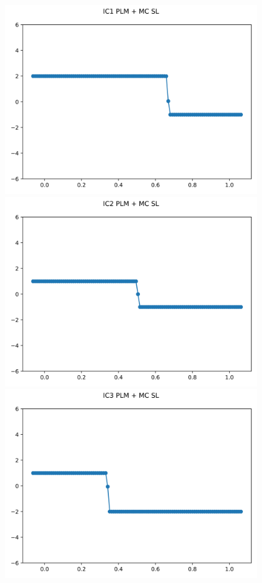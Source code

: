 \documentclass{article}
\begin{document}
\begin{figure}[t]
    \emp
        \centering
        \includegraphics[width=.95\textwidth]{../../code/hires_IC1Methodpo_plot.png}
        \includegraphics[width=.95\textwidth]{../../code/hires_IC2Methodpo_plot.png}
        \includegraphics[width=.95\textwidth]{../../code/hires_IC3Methodpo_plot.png}

\end{figure}
\end{document}
